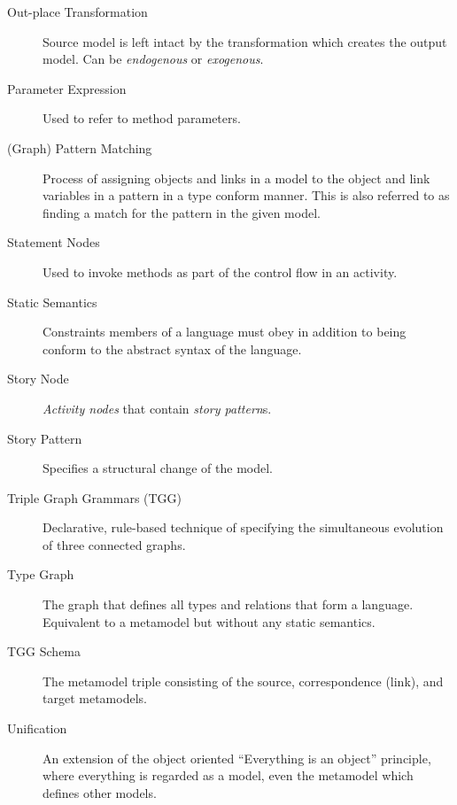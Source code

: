 \begin{description}
\item[Out-place Transformation] %
Source model is left intact by the transformation which creates the output model. Can be \emph{endogenous} or \emph{exogenous}.

\item[Parameter Expression]  %
Used to refer to method parameters.

\item[(Graph) Pattern Matching] %
Process of assigning objects and links in a model to the object and link variables in a pattern in a type conform manner. This is also referred to as finding a
match for the pattern in the given model.

\item[Statement Nodes] %
Used to invoke methods as part of the control flow in an activity.

\item[Static Semantics] %
Constraints members of a language must obey in addition to being conform to the abstract syntax of the language.

\item[Story Node] %
\emph{Activity nodes} that contain \emph{story pattern}s.

\item[Story Pattern] %
Specifies a structural change of the model.

\item[Triple Graph Grammars (TGG)] %
Declarative, rule-based technique of specifying the simultaneous evolution of three connected graphs.

\item[Type Graph] %
The graph that defines all types and relations that form a language. Equivalent to a metamodel but without any static semantics.

\item[TGG Schema] %
The metamodel triple consisting of the source, correspondence (link), and target metamodels.

\item[Unification]  %
An extension of the object oriented ``Everything is an object'' principle, where everything is regarded as a model, even the metamodel which defines other
models.

\end{description}
